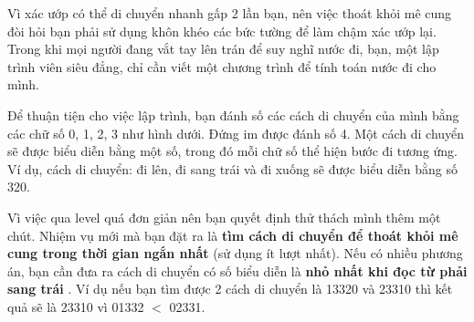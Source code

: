 Vì xác ướp có thể di chuyển nhanh gấp 2 lần bạn, nên việc thoát khỏi mê cung đòi hỏi bạn phải sử dụng khôn khéo các bức tường để làm chậm xác ướp lại. Trong khi mọi người đang vắt tay lên trán để suy nghĩ nước đi, bạn, một lập trình viên siêu đẳng, chỉ cần viết một chương trình để tính toán nước đi cho mình.

Để thuận tiện cho việc lập trình, bạn đánh số các cách di chuyển của mình bằng các chữ số 0, 1, 2, 3 như hình dưới. Đứng im được đánh số 4. Một cách di chuyển sẽ được biểu diễn bằng một số, trong đó mỗi chữ số thể hiện bước đi tương ứng. Ví dụ, cách di chuyển: đi lên, đi sang trái và đi xuống sẽ được biểu diễn bằng số 320.

Vì việc qua level quá đơn giản nên bạn quyết định thử thách mình thêm một chút. Nhiệm vụ mới mà bạn đặt ra là \textbf{ tìm cách di chuyển để thoát khỏi mê cung trong thời gian ngắn nhất } (sử dụng ít lượt nhất). Nếu có nhiều phương án, bạn cần đưa ra cách di chuyển có số biểu diễn là \textbf{ nhỏ nhất khi đọc từ phải sang trái } . Ví dụ nếu bạn tìm được 2 cách di chuyển là 13320 và 23310 thì kết quả sẽ là 23310 vì 01332 $<$ 02331.